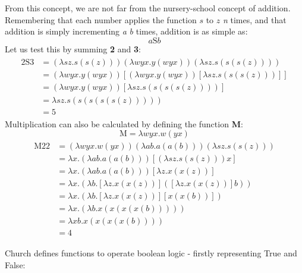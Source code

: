 \documentclass {article}
\begin{document}
From this concept, we are not far from the nursery-school concept of addition. Remembering that each number applies the function $s$ to $z$ \textit{n} times, and that addition is simply incrementing \textit{a} \textit{b} times, addition is as simple as:
\begin{equation*}
a\bm{\mathrm{S}}b	
\end{equation*}
Let us test this by summing \textbf{2} and \textbf{3}:
\begin{gather*}
\begin{aligned}
\bm{\mathrm{2S3}} &= (\lambda sz.s(s(z))) (\lambda wyx.y(wyx)) (\lambda sz.s(s(s(z))))\\
&= (\lambda wyx.y(wyx)) [(\lambda wyx.y(wyx)) [\lambda sz.s(s(s(z)))]]\\
&= (\lambda wyx.y(wyx)) [\lambda sz.s(s(s(s(z))))]\\
&= \lambda sz.s(s(s(s(s(z)))))\\
&= \bm{\mathrm{5}}
\end{aligned}
\end{gather*}
Multiplication can also be calculated by defining the function \textbf{M}:
\begin{equation*}
\bm{\mathrm{M}} = \lambda wyx.w(yx)
\end{equation*}
\begin{gather*}
\begin{aligned}
\bm{\mathrm{M22}} &= (\lambda wyx.w(yx))(\lambda ab.a(a(b)))(\lambda sz.s(s(z)))\\
&= \lambda x.(\lambda ab.a(a(b)))[(\lambda sz.s(s(z)))x]\\
&= \lambda x.(\lambda ab.a(a(b)))[\lambda z.x(x(z))]\\
&= \lambda x.(\lambda b.[\lambda z.x(x(z))]([\lambda z.x(x(z))]b))\\
&= \lambda x.(\lambda b.[\lambda z.x(x(z))][x(x(b))])\\
&= \lambda x.(\lambda b.x(x(x(x(b)))))\\
&= \lambda xb.x(x(x(x(b))))\\
&= \bm{\mathrm{4}}
\end{aligned}
\end{gather*}

    Church defines functions to operate boolean logic - firstly representing True and False:
    
\end{document}
